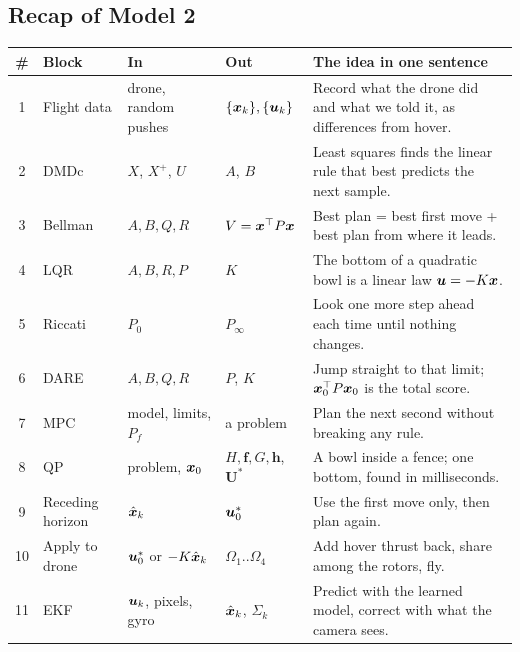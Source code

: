 \subsection*{Recap of Model 2}
\begin{center}\small
\begin{tabularx}{\linewidth}{@{}c >{\raggedright\arraybackslash}p{2.6cm} >{\raggedright\arraybackslash}p{2.7cm} >{\raggedright\arraybackslash}p{2.5cm} X@{}}
\toprule
\textbf{\#} & \textbf{Block} & \textbf{In} & \textbf{Out} & \textbf{The idea in one sentence}\\
\midrule
1 & Flight data & drone, random pushes & $\{\bm{x}_k\},\{\bm{u}_k\}$ & Record what the drone did and what we told it, as differences from hover.\\
2 & DMDc & $X$, $X^+$, $U$ & $A$, $B$ & Least squares finds the linear rule that best predicts the next sample.\\
3 & Bellman & $A,B,Q,R$ & $V=\bm{x}^\top P\bm{x}$ & Best plan = best first move + best plan from where it leads.\\
4 & LQR & $A,B,R,P$ & $K$ & The bottom of a quadratic bowl is a linear law $\bm{u}=-K\bm{x}$.\\
5 & Riccati & $P_0$ & $P_\infty$ & Look one more step ahead each time until nothing changes.\\
6 & DARE & $A,B,Q,R$ & $P$, $K$ & Jump straight to that limit; $\bm{x}_0^\top P\bm{x}_0$ is the total score.\\
7 & MPC & model, limits, $P_f$ & a problem & Plan the next second without breaking any rule.\\
8 & QP & problem, $\bm{x}_0$ & $H,\bm f,G,\bm h$, $\mathbf U^*$ & A bowl inside a fence; one bottom, found in milliseconds.\\
9 & Receding horizon & $\hat{\bm x}_k$ & $\bm{u}_0^*$ & Use the first move only, then plan again.\\
10 & Apply to drone & $\bm{u}_0^*$ or $-K\hat{\bm x}_k$ & $\Omega_1..\Omega_4$ & Add hover thrust back, share among the rotors, fly.\\
11 & EKF & $\bm{u}_k$, pixels, gyro & $\hat{\bm x}_k$, $\Sigma_k$ & Predict with the learned model, correct with what the camera sees.\\
\bottomrule
\end{tabularx}
\end{center}
